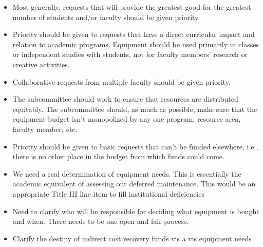 \begin{itemize}

\item Most generally, requests that will provide the greatest good for
the greatest number of students and/or faculty should be given
priority. 

\item Priority should be given to requests that have a direct
curricular impact and relation to academic programs.  Equipment should
be used primarily in classes or independent studies with students, not
for faculty members' research or creative activities. 

\item Collaborative requests from multiple faculty should be given
priority. 

\item The subcommittee should work to ensure that resources are
distributed equitably.  The subcommittee should, as much as possible,
make sure that the equipment budget isn't monopolized by any one
program, resource area, faculty member, etc.


\item Priority should be given to basic requests that can't be funded
elsewhere, i.e., there is no other place in the budget from which
funds could come.  \\

\end{itemize}

\newpage
{}

\begin{itemize}

\item We need a real determination of equipment needs.  This is
essentially the academic equivalent of assessing our deferred
maintenance.  This would be an appropriate Title III line item to fill
institutional deficiencies 

\item Need to clarify who will be responsible for deciding what
equipment is bought and when.  There needs to be one open and fair
process. 

\item Clarify the destiny of indirect cost recovery funds vis a vis equipment needs    

\end{itemize}

